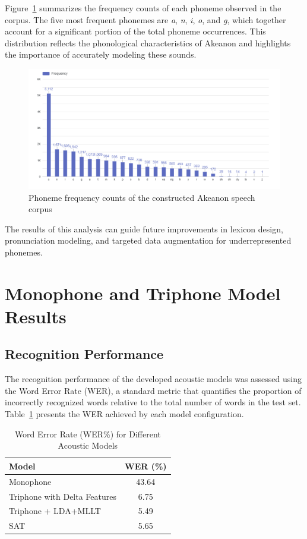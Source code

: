 Figure~\ref{fig:phoneme-frequency} summarizes the frequency counts of each phoneme observed in the corpus. The five most frequent phonemes are \textit{a}, \textit{n}, \textit{i}, \textit{o}, and \textit{g}, which together account for a significant portion of the total phoneme occurrences. This distribution reflects the phonological characteristics of Akeanon and highlights the importance of accurately modeling these sounds.

\begin{figure}[h!]
	\centering
	\includegraphics[width=\textwidth]{./figures/frequency.png}
   \caption{Phoneme frequency counts of the constructed Akeanon speech corpus}
	\label{fig:phoneme-frequency}
\end{figure}

The results of this analysis can guide future improvements in lexicon design, pronunciation modeling, and targeted data augmentation for underrepresented phonemes.

\section{Monophone and Triphone Model Results}

\subsection{Recognition Performance}

The recognition performance of the developed acoustic models was assessed using the Word Error Rate (WER), a standard metric that quantifies the proportion of incorrectly recognized words relative to the total number of words in the test set. Table~\ref{tab:wer-results} presents the WER achieved by each model configuration.

\begin{table}[H]
	\centering
	\renewcommand{\arraystretch}{1.3}
	\setlength{\tabcolsep}{16pt}
	\caption{Word Error Rate (WER\%) for Different Acoustic Models}
	\label{tab:wer-results}
	\begin{tabular}{|l|c|}
		\hline
		\textbf{Model} & \textbf{WER (\%)} \\
		\hline
		Monophone & 43.64 \\
		Triphone with Delta Features & 6.75 \\
		Triphone + LDA+MLLT & 5.49 \\
		SAT & 5.65 \\
		\hline
	\end{tabular}
\end{table}

